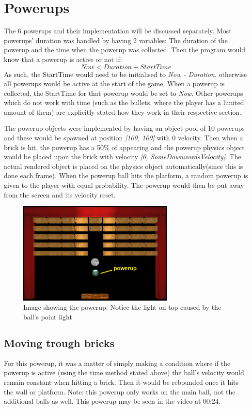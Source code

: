 \chapter{Powerups}

The 6 powerups and their implementation will be discussed separately. Most powerups' duration was handled by having 2 variables: The duration of the powerup and the time when the powerup was collected. Then the program would know that a powerup is active or not if:
\[ Now < Duration + StartTime \]
As such, the StartTime would need to be initialised to \textit{Now - Duration}, otherwise all powerups would be active at the start of the game. When a powerup is collected, the StartTime for that powerup would be set to \textit{Now}. Other powerups which do not work with time (such as the bullets, where the player has a limited amount of them) are explicitly stated how they work in their respective section.

The powerup objects were implemented by having an object pool of 10 powerups and these would be spawned at position \textit{[100, 100]} with 0 velocity. Then when a brick is hit, the powerup has a 50\% of appearing and the powerup physics object would be placed upon the brick with velocity \textit{[0, SomeDownwardsVelocity]}. The actual rendered object is placed on the physics object automatically(since this is done each frame). When the powerup ball hits the platform, a random powerup is given to the player with equal probability. The powerup would then be put away from the screen and its velocity reset.

\begin{figure}[H]
	\centering
	\includegraphics[width=0.7\textwidth]{Images/powerup.png}
	\caption{Image showing the powerup. Notice the light on top caused by the ball's point light}
\end{figure}

\section{Moving trough bricks}
For this powerup, it was a matter of simply making a condition where if the powerup is active (using the time method stated above) the ball's velocity would remain constant when hitting a brick. Then it would be rebounded once it hits the wall or platform. Note: this powerup only works on the main ball, not the additional balls as well. This powerup may be seen in the video at 00:24.

